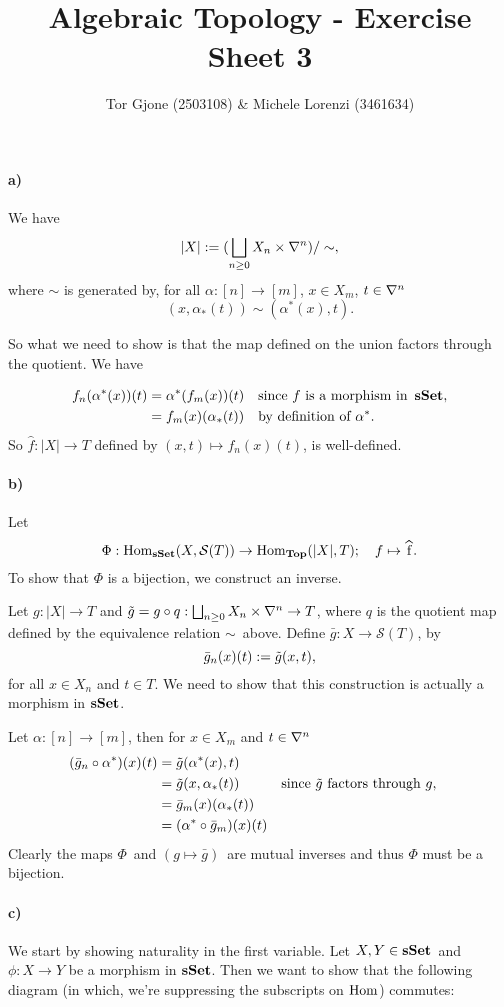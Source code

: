 \documentclass[a4paper,11pt,english]{article}
\title{\textbf{Algebraic Topology} - Exercise Sheet 3}
\author{Tor Gjone (2503108) \& Michele Lorenzi (3461634)}
\renewcommand{\S}[1]{\mathcal{S}(#1)}
\begin{document}
\mmaketitle

\begin{exercise}[1]

\paragraph{a)}
We have 
\[ |X| := (\bigsqcup_{n\ge 0} X_n \times \nabla^n ) / \sim,  \]
where $\sim$ is generated by, for all $\alpha: [n]\to[m]$, $x\in X_m$, $t \in
\nabla^n$
\[ (x,\alpha_*(t)) \sim (\alpha^*(x), t). \]

So what we need to show is that the map defined on the union factors through the
quotient. We have

\begin{align*}
f_n(\alpha^*(x))(t) &= \alpha^*(f_m(x)) (t)
&& \text{since } f \text{ is a morphism
in } \operatorname{{\bf sSet}}, \\
&= f_m(x)(\alpha_*(t)) 
&&\text{by definition of } \alpha^*.
\end{align*}
So $\hat{f}: |X| \to T$ defined by $(x,t) \mapsto f_n(x)(t)$, is well-defined.

\paragraph{b)}
Let 
\[ \Phi: \Hom_{\sSet}(X, \S T) \to \Hom_{\Top} (|X|, T); \quad f \mapsto \hat f. \]
To show that $\Phi$ is a bijection, we construct an inverse. 

Let $g: |X| \to T$ and $\tilde g = g \circ q: \bigsqcup_{n\ge 0} X_n\times \nabla^n \to
T$, where $q$ is the quotient map defined by the equivalence relation
$\sim$ above. Define $\bar g: X \to \S T$, by 
\[ \bar g_n (x)(t) := \tilde g(x,t),  \]
for all $x \in X_n$ and $t\in T$. We need to show that this construction is actually a morphism in $\operatorname{{\bf sSet}}$. 

Let $\alpha: [n]\to[m]$, then for $x\in X_m$ and $t \in \nabla^n$
\begin{align*}
(\bar g_n \circ \alpha^*)(x)(t) &= \tilde g(\alpha^*(x), t) \\
&= \tilde g (x, \alpha_*(t)) && \text{since } \tilde g \text{ factors through } g, \\
&= \bar g_m (x)(\alpha_*(t)) \\
&= (\alpha^* \circ \bar g_m)(x)(t)
\end{align*}
Clearly the maps $\Phi$ and $(g \mapsto \bar g)$ are mutual inverses and thus
$\Phi$ must be a bijection.

\paragraph{c)}
We start by showing naturality in the first variable. 
Let $X,Y \in \operatorname{{\bf sSet}}$ and $\phi : X \to Y$ be a morphism in $\operatorname{{\bf sSet}}$. Then we want
to show that the following diagram (in which, we're suppressing the subscripts on
$\operatorname{Hom}$) commutes:


\end{exercise}
\end{document}
